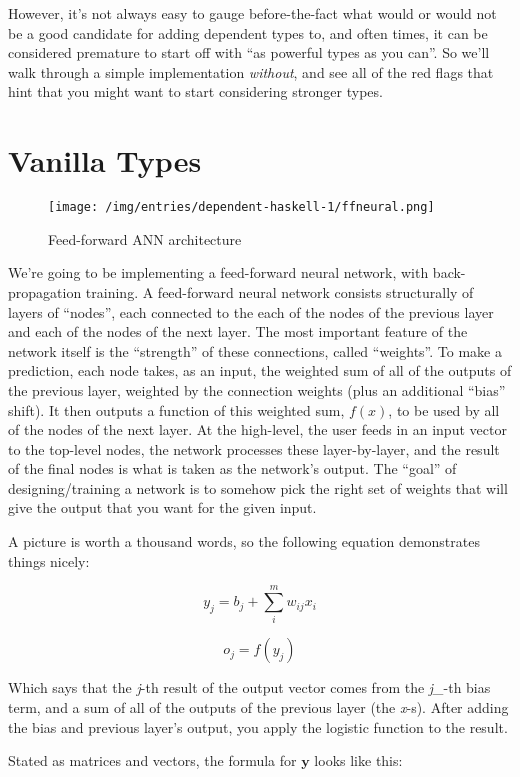 \documentclass[]{article}
\begin{document}
However, it's not always easy to gauge before-the-fact what would or
would not be a good candidate for adding dependent types to, and often
times, it can be considered premature to start off with ``as powerful
types as you can''. So we'll walk through a simple implementation
\emph{without}, and see all of the red flags that hint that you might
want to start considering stronger types.

\section{Vanilla Types}\label{vanilla-types}

\begin{figure}[htbp]
\centering
\texttt{[image: /img/entries/dependent-haskell-1/ffneural.png]}
\caption{Feed-forward ANN architecture}
\end{figure}

We're going to be implementing a feed-forward neural network, with
back-propagation training. A feed-forward neural network consists
structurally of layers of ``nodes'', each connected to the each of the
nodes of the previous layer and each of the nodes of the next layer. The
most important feature of the network itself is the ``strength'' of
these connections, called ``weights''. To make a prediction, each node
takes, as an input, the weighted sum of all of the outputs of the
previous layer, weighted by the connection weights (plus an additional
``bias'' shift). It then outputs a function of this weighted sum,
\(f(x)\), to be used by all of the nodes of the next layer. At the
high-level, the user feeds in an input vector to the top-level nodes,
the network processes these layer-by-layer, and the result of the final
nodes is what is taken as the network's output. The ``goal'' of
designing/training a network is to somehow pick the right set of weights
that will give the output that you want for the given input.

A picture is worth a thousand words, so the following equation
demonstrates things nicely:

\[
y_j = b_j + \sum_i^m w_{ij} x_i
\]

\[
o_j = f(y_j)
\]

Which says that the \emph{j}-th result of the output vector comes from
the \emph{j\_}-th bias term, and a sum of all of the outputs of the
previous layer (the \emph{x}-s). After adding the bias and previous
layer's output, you apply the logistic function to the result.

Stated as matrices and vectors, the formula for \(\mathbf{y}\) looks
like this:
\end{document}
